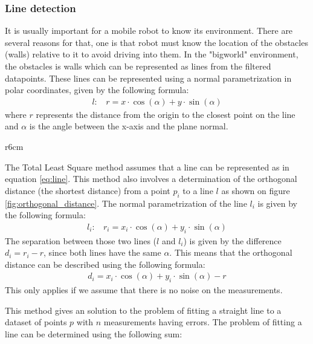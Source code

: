\documentclass[../Head/Main.tex]{subfiles}
\begin{document}
\subsubsection{Line detection}
It is usually important for a mobile robot to know its environment. There are several reasons for that, one is that robot must know the location of the obstacles (walls) relative to it to avoid driving into them. In the "bigworld" environment, the obstacles is walls which can be represented as lines from the filtered datapoints. These lines can be represented using a normal parametrization in polar coordinates, given by the following formula:
\begin{align}
    l:~~~~r = x\cdot\cos(\alpha)+y\cdot\sin(\alpha)
    \label{eq:line}
\end{align}
where $r$ represents the distance from the origin to the closest point on the line and $\alpha$ is the angle between the x-axis and the plane normal. \par
\begin{wrapfigure}{r}{6cm}
	\vspace{-12pt}
	\centering
	
	\vspace{-5pt}
	\caption{Orthogonal distance from point $p_1$ to line $l$}
	\label{fig:orthogonal_distance}
	\vspace{-5pt}
\end{wrapfigure}
The Total Least Square method assumes that a line can be represented as in equation \ref{eq:line}. This method also involves a determination of the orthogonal distance (the shortest distance) from a point $p_i$ to a line $l$ as shown on  figure \ref{fig:orthogonal_distance}. The normal parametrization of the line $l_i$ is given by the following formula:
\begin{align}
    l_i:~~~~r_i = x_i\cdot\cos(\alpha)+y_i\cdot\sin(\alpha)
\end{align}
The separation between those two lines ($l$ and $l_i$) is given by the difference $d_i=r_i-r$, since both lines have the same $\alpha$. This means that the orthogonal distance can be described using the following formula:
\begin{align}
    d_i = x_i\cdot\cos(\alpha)+y_i\cdot\sin(\alpha) - r
\end{align}
This only applies if we assume that there is no noise on the measurements. \par
This method gives an solution to the problem of fitting a straight line to a dataset of points $p$ with $n$ measurements having errors. The problem of fitting a line can be determined using the following sum:
\end{document}
